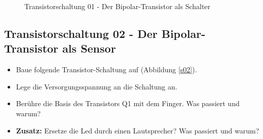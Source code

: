 \begin{figure}[H]
	\centering
	\caption{Transistorschaltung 01 - Der Bipolar-Transistor als Schalter}
	\label{s01}
\end{figure}


\subsection*{Transistorschaltung 02 - Der Bipolar-Transistor als Sensor}

\begin{itemize}
\itemsep1pt\parskip0pt
\item Baue folgende Transistor-Schaltung auf (Abbildung \ref{s02}). 
\item Lege die Versorgungsspannung an die Schaltung an.
\item Berühre die Basis des Transistors Q1 mit dem Finger. Was passiert und warum?
\item \textbf{Zusatz:} Ersetze die Led durch einen Lautsprecher? Was passiert und warum?
\end{itemize}

